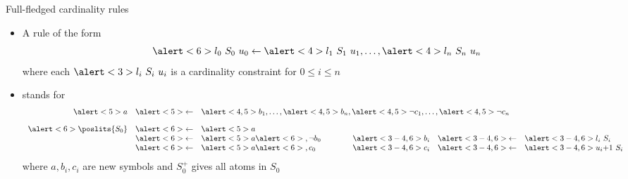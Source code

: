 \begin{frame}{Full-fledged cardinality rules}
  \begin{itemize}
  \item A rule of the form
    \[
      \alert<6>{l_0~S_0~u_0}\leftarrow\alert<4>{l_1~S_1~u_1},\dots,\alert<4>{l_n~S_n~u_n}
    \]
    where each $\alert<3>{l_i~S_i~u_i}$ is a cardinality constraint for $0\leq i\leq n$
  \item<only@2-> [] stands for %
    \[
      \begin{array}{rclp{20pt}rcl}
                    \alert<5>{a}&\alert<5>{\leftarrow}&\multicolumn{5}{l}{\alert<4,5>{b_1},\dots,\alert<4,5>{b_n},\alert<4,5>{\neg c_1},\dots,\alert<4,5>{\neg c_n}}\\[10pt]
        \alert<6>{\poslits{S_0}}&\alert<6>{\leftarrow}&\alert<5>{a}\\
                                &\alert<6>{\leftarrow}&\alert<5>{a}\alert<6>{,\neg b_0}&&\alert<3-4,6>{b_i}&\alert<3-4,6>{\leftarrow}&\alert<3-4,6>{l_i~S_i}\\
                                &\alert<6>{\leftarrow}&\alert<5>{a}\alert<6>{,     c_0}&&\alert<3-4,6>{c_i}&\alert<3-4,6>{\leftarrow}&\alert<3-4,6>{u_i{+}1~S_i}
      \end{array}
    \]
    where $a,b_i,c_i$ are new symbols and $S_0^+$ gives all atoms in $S_0$
  \end{itemize}
\end{frame}
%
